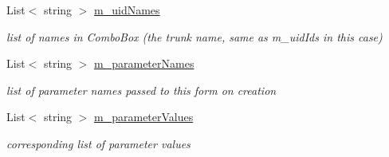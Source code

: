 \begin{DoxyCompactItemize}
List$<$ string $>$ \hyperlink{class_ias_pbx_config_1_1_trunk_details_a5de586a82e2347a9900caf7e478c96e3}{m\_\-uidNames}
\begin{DoxyCompactList}\small\item\em list of names in ComboBox (the trunk name, same as m\_\-uidIds in this case) \item\end{DoxyCompactList}\item 
List$<$ string $>$ \hyperlink{class_ias_pbx_config_1_1_trunk_details_ab128217bd9aa7cdc63636166ed26e961}{m\_\-parameterNames}
\begin{DoxyCompactList}\small\item\em list of parameter names passed to this form on creation \item\end{DoxyCompactList}\item 
List$<$ string $>$ \hyperlink{class_ias_pbx_config_1_1_trunk_details_aed1fa61920a4ef53d137af334d569e40}{m\_\-parameterValues}
\begin{DoxyCompactList}\small\item\em corresponding list of parameter values \item\end{DoxyCompactList}\end{DoxyCompactItemize}
